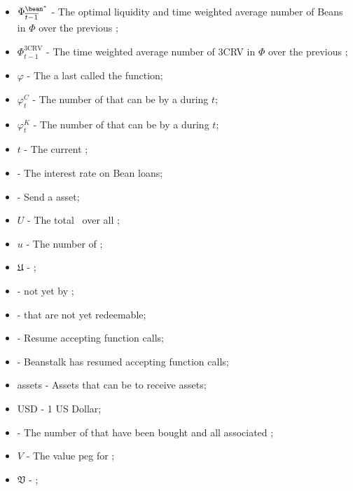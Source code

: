 \documentclass[class=article, crop=false]{standalone}
\begin{document}
\begin{itemize}[topsep=0pt, itemsep=3pt,leftmargin=16pt]
    \item[] $\Phi_{\overline{t-1}}^{{\bean}^*}$ - The optimal liquidity and time weighted average number of Beans in $\Phi$ over the previous ;
    \item[] $\Phi_{\overline{t-1}}^{\text{3CRV}}$ - The time weighted average number of 3CRV in $\Phi$ over the previous ;
    \item[] $\varphi$ - The  a  last called the  function;
    \item[] ${\varphi}_t^C$ - The number of   that can be  by a  during $t$;
    \item[] ${\varphi}_t^K$ - The number of   that can be  by a  during $t$;
    \item[] $t$ - The current ;
    \item[]  - The interest rate on Bean loans;
    \item[]  - Send a  asset;
    \item[] $U$ - The total  \Bean\ over all ;
    \item[] $u$ - The number of  \Bean;
    \item[] $\mathfrak{U}$ -  ;
    \item[]   -  not yet  by  ;
    \item[]   -  that are not yet redeemable;
    \item[]  - Resume accepting  function calls;
    \item[]  - Beanstalk has resumed accepting  function calls;
    \item[]  assets - Assets that can be  to receive  assets;
    \item[] USD - 1 US Dollar;
    \item[]   - The number of  that have been bought and  all associated ;
    \item[] $V$ - The value peg for ;
    \item[] $\mathfrak{V}$ -  ;

\end{itemize}
\end{document}
